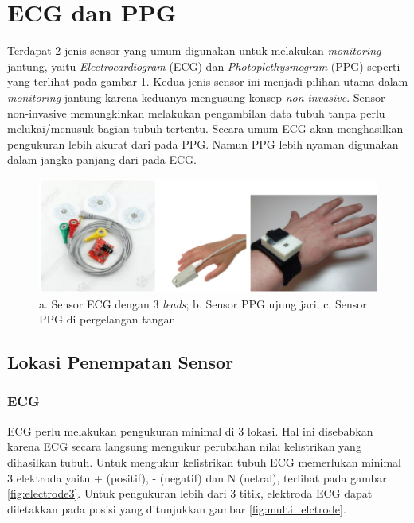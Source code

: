\section{ECG dan PPG}
Terdapat 2 jenis sensor yang umum digunakan untuk melakukan \textit{monitoring} jantung, yaitu \textit{Electrocardiogram} (ECG) dan \textit{Photoplethysmogram} (PPG) seperti yang terlihat pada gambar \ref{fig:ecg_n_ppg}. Kedua jenis sensor ini menjadi pilihan utama dalam \textit{monitoring} jantung karena keduanya mengusung konsep \textit{non-invasive}. Sensor non-invasive memungkinkan melakukan pengambilan data tubuh tanpa perlu melukai/menusuk bagian tubuh tertentu. Secara umum ECG akan menghasilkan pengukuran lebih akurat dari pada PPG. Namun PPG lebih nyaman digunakan dalam jangka panjang dari pada ECG.

\begin{figure}[H]
    \centering
    \includegraphics[scale=0.3]{images/sensors.png}
    \caption{a. Sensor ECG dengan 3 \textit{leads}; b. Sensor PPG ujung jari; c. Sensor PPG di pergelangan tangan}
    \label{fig:ecg_n_ppg}
\end{figure}

\subsection{Lokasi Penempatan Sensor}
\subsubsection{ECG}
ECG perlu melakukan pengukuran minimal di 3 lokasi. Hal ini disebabkan karena ECG secara langsung mengukur perubahan nilai kelistrikan yang dihasilkan tubuh. Untuk mengukur kelistrikan tubuh ECG memerlukan minimal 3 elektroda yaitu + (positif), - (negatif) dan N (netral), terlihat pada gambar \ref{fig:electrode3}. Untuk pengukuran lebih dari 3 titik, elektroda ECG dapat diletakkan pada posisi yang ditunjukkan gambar \ref{fig:multi_elctrode}.

